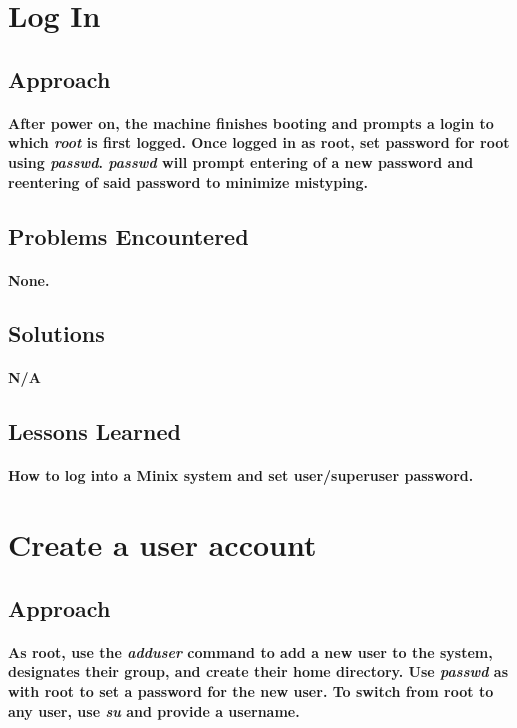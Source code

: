 \documentclass[12pt, oneside, a4paper]{article}
\begin{document}
\section{Log In}
	\subsection*{Approach}
		\paragraph{
			After power on, the machine finishes booting and prompts a login to which
			\emph{root} is first logged.  Once logged in as root, set password
			for root using \emph{passwd}.  \emph{passwd} will prompt
			entering of a new password and reentering of said password to minimize
			mistyping.
		}
	\subsection*{Problems Encountered}
		\paragraph{
			None.
		}
	\subsection*{Solutions}
		\paragraph{
			N/A
		}
	\subsection*{Lessons Learned}
		\paragraph{
			How to log into a Minix system and set user/superuser password.
		}
\newpage

\section{Create a user account}
	\subsection*{Approach}
		\paragraph{
			As root, use the \emph{adduser} command to add a new user to the
			system, designates their group, and create their home directory.  Use
			\emph{passwd} as with root to set a password for the new user.
			To switch from root to any user, use \emph{su} and provide a username.
		}
\end{document}
